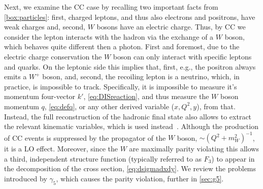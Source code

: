 Next, we examine the CC case by recalling two important facts from \cref{box:particles}:
first, charged leptons, and thus also electrons and positrons, have weak charges and, second, $W$ bosons have an electric charge.
Thus, by CC we consider the lepton interacts with the hadron via the exchange of a $W$ boson, which behaves quite different then a photon.
First and foremost, due to the electric charge conservation the $W$ boson can only interact with specific leptons and quarks.
On the leptonic side this implies that, first, e.g., the positron always emits a $W^+$ boson, and, second, the recoiling lepton is a neutrino, which, in practice, is impossible to track.
Specifically, it is impossible to measure it's momentum four-vector $k'$, \cref{eq:DISreaction}, and thus measure the $W$ boson momentum $q$, \cref{eq:defq}, or any other derived variable ($x,Q^2,y$), from that.
Instead, the full reconstruction of the hadronic final state also allows to extract the relevant kinematic variables, which is used instead~\cite{H1:2015ubc}.
Although the production of CC events is suppressed by the propagator of the $W$ boson, $\sim (Q^2 + m_W^2)^{-1}$, it is a LO effect.
Moreover, since the $W$ are maximally parity violating this allows a third, independent structure function (typically referred to as $F_3$) to appear in the decomposition of the cross section, \cref{eq:dsigmadxdy}.
We review the problems introduced by $\gamma_5$, which causes the parity violation, further in \cref{sec:g5}.

